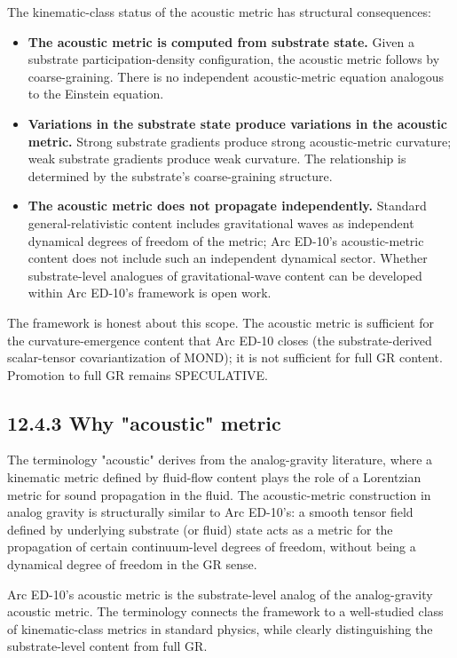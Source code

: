 \documentclass[11pt]{book}
\begin{document}
The kinematic-class status of the acoustic metric has structural consequences:

\begin{itemize}
\item \textbf{The acoustic metric is computed from substrate state.} Given a substrate participation-density configuration, the acoustic metric follows by coarse-graining. There is no independent acoustic-metric equation analogous to the Einstein equation.
\item \textbf{Variations in the substrate state produce variations in the acoustic metric.} Strong substrate gradients produce strong acoustic-metric curvature; weak substrate gradients produce weak curvature. The relationship is determined by the substrate's coarse-graining structure.
\item \textbf{The acoustic metric does not propagate independently.} Standard general-relativistic content includes gravitational waves as independent dynamical degrees of freedom of the metric; Arc ED-10's acoustic-metric content does not include such an independent dynamical sector. Whether substrate-level analogues of gravitational-wave content can be developed within Arc ED-10's framework is open work.
\end{itemize}

The framework is honest about this scope. The acoustic metric is sufficient for the curvature-emergence content that Arc ED-10 closes (the substrate-derived scalar-tensor covariantization of MOND); it is not sufficient for full GR content. Promotion to full GR remains SPECULATIVE.

\subsection{12.4.3 Why "acoustic" metric}

The terminology "acoustic" derives from the analog-gravity literature, where a kinematic metric defined by fluid-flow content plays the role of a Lorentzian metric for sound propagation in the fluid. The acoustic-metric construction in analog gravity is structurally similar to Arc ED-10's: a smooth tensor field defined by underlying substrate (or fluid) state acts as a metric for the propagation of certain continuum-level degrees of freedom, without being a dynamical degree of freedom in the GR sense.

Arc ED-10's acoustic metric is the substrate-level analog of the analog-gravity acoustic metric. The terminology connects the framework to a well-studied class of kinematic-class metrics in standard physics, while clearly distinguishing the substrate-level content from full GR.
\end{document}
